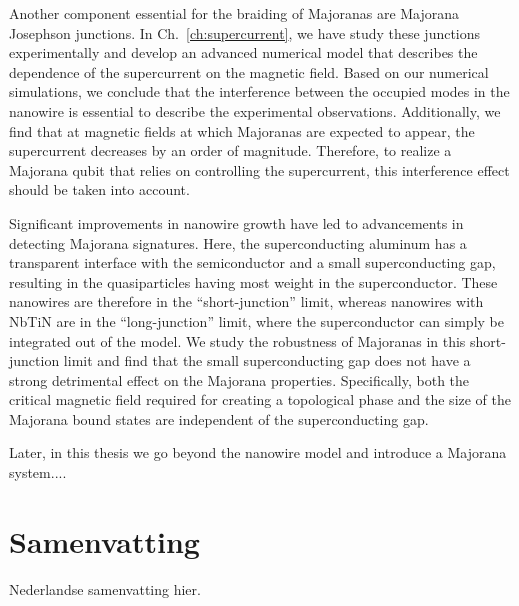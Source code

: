 Another component essential for the braiding of Majoranas are Majorana Josephson junctions.
In Ch.~\ref{ch:supercurrent}, we have study these junctions experimentally and develop an advanced numerical model that describes the dependence of the supercurrent on the magnetic field.
Based on our numerical simulations, we conclude that the interference between the occupied modes in the nanowire is essential to describe the experimental observations.
Additionally, we find that at magnetic fields at which Majoranas are expected to appear, the supercurrent decreases by an order of magnitude.
Therefore, to realize a Majorana qubit that relies on controlling the supercurrent, this interference effect should be taken into account.

Significant improvements in nanowire growth have led to advancements in detecting Majorana signatures.
Here, the superconducting aluminum has a transparent interface with the semiconductor and a small superconducting gap, resulting in the quasiparticles having most weight in the superconductor.
These nanowires are therefore in the ``short-junction'' limit, whereas nanowires with NbTiN are in the ``long-junction'' limit, where the superconductor can simply be integrated out of the model.
We study the robustness of Majoranas in this short-junction limit and find that the small superconducting gap does not have a strong detrimental effect on the Majorana properties.
Specifically, both the critical magnetic field required for creating a topological phase and the size of the Majorana bound states are independent of the superconducting gap.

Later, in this thesis we go beyond the nanowire model and introduce a Majorana system....

\chapter*{Samenvatting}
{

Nederlandse samenvatting hier.

}
